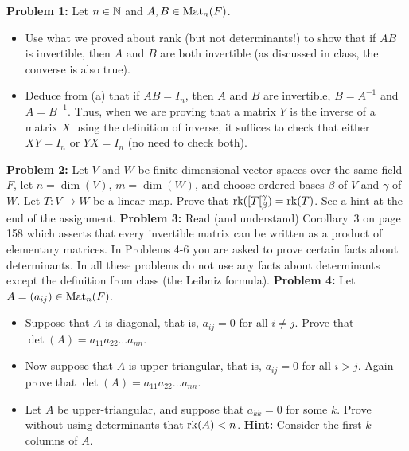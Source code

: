 \documentclass[11pt]{amsart}
\begin{document}
{\bf Problem 1: } Let $n\in{\mathbb N}$ and $A,B\in{\rm Mat}_n(F)$.
\begin{itemize}
\item[(a)] Use what we proved about rank (but not determinants!) to show that if $AB$ is invertible, then
$A$ and $B$ are both invertible (as discussed in class, the converse is also true).
\item[(b)] Deduce from (a) that if $AB=I_n$, then $A$ and $B$ are invertible, $B=A^{-1}$ and $A=B^{-1}$.
Thus, when we are proving that a matrix $Y$ is the inverse of a matrix $X$ using the definition of inverse, it suffices
to check that either $XY=I_n$ or $YX=I_n$ (no need to check both).
\end{itemize}
\skv
{\bf Problem 2: } Let $V$ and $W$ be finite-dimensional vector spaces over the same field $F$, let $n=\dim(V)$, $m=\dim(W)$,
and choose ordered bases $\beta$ of $V$ and $\gamma$ of $W$. Let $T:V\to W$ be a linear map. Prove that
${\rm rk}([T[_{\beta}^{\gamma})={\rm rk}(T)$. See a hint at the end of the assignment.
\skv
{\bf Problem 3: } Read (and understand) Corollary~3 on page 158 which asserts that every invertible matrix can be written as a 
product of elementary matrices.
\skv
In Problems 4-6 you are asked to prove certain facts about determinants. In all these problems do not use any facts about determinants except
the definition from class (the Leibniz formula).
\skv
{\bf Problem 4: } Let $A=(a_{ij})\in {\rm Mat}_{n}(F)$.
\begin{itemize}
\item[(a)] Suppose that $A$ is diagonal, that is, $a_{ij}=0$ for all $i\neq j$. Prove that
$\det(A)=a_{11}a_{22}\ldots a_{nn}$.
\item[(b)] Now suppose that $A$ is upper-triangular, that is, $a_{ij}=0$ for all $i>j$. Again prove that
$\det(A)=a_{11}a_{22}\ldots a_{nn}$.
\item[(c)] Let $A$ be upper-triangular, and suppose that $a_{kk}=0$ for some $k$. Prove without using
determinants that ${\rm rk}(A)<n$. {\bf Hint:} Consider the first $k$ columns of $A$.
\end{itemize}
\skv
\end{document}
